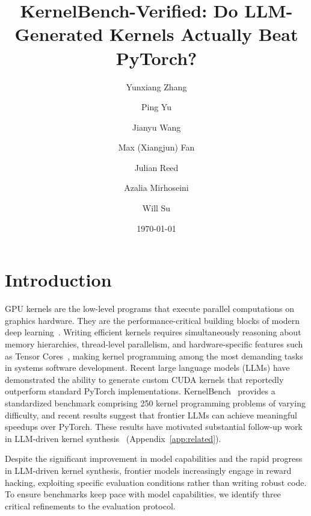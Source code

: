 \documentclass[]{fairmeta}
\title{KernelBench-Verified: Do LLM-Generated Kernels Actually Beat PyTorch?}
\author[1]{Yunxiang Zhang}
\author[2]{Ping Yu}
\author[1]{Jianyu Wang}
\author[1]{Max (Xiangjun) Fan}
\author[3]{Julian Reed}
\author[3]{Azalia Mirhoseini}
\author[1]{Will Su}
\affiliation[1]{Meta}
\affiliation[2]{FAIR at Meta SuperIntelligence Lab}
\affiliation[3]{Stanford University}
\date{\today}
\begin{document}
\maketitle

\section{Introduction}
\label{sec:intro}

GPU kernels are the low-level programs that execute parallel computations on graphics hardware. They are the performance-critical building blocks of modern deep learning~\citep{robustkbench,kernelbench}. Writing efficient kernels requires simultaneously reasoning about memory hierarchies, thread-level parallelism, and hardware-specific features such as Tensor Cores~\citep{nvidia_h200_datasheet,DBLP:journals/corr/abs-2602-24286}, making kernel programming among the most demanding tasks in systems software development. Recent large language models (LLMs) have demonstrated the ability to generate custom CUDA kernels that reportedly outperform standard PyTorch implementations. KernelBench~\citep{kernelbench} provides a standardized benchmark comprising 250 kernel programming problems of varying difficulty, and recent results suggest that frontier LLMs can achieve meaningful speedups over PyTorch. These results have motivated substantial follow-up work in LLM-driven kernel synthesis~\citep{cao2026k,DBLP:journals/corr/abs-2602-24286,du2026kernel,liu2026dr,wiedemann2026kernelfoundry} (Appendix~\ref{app:related}).

Despite the significant improvement in model capabilities and the rapid progress in LLM-driven kernel synthesis, frontier models  increasingly engage in reward hacking, exploiting specific evaluation conditions rather than writing robust code. To ensure benchmarks keep pace with model capabilities, we identify three critical refinements to the evaluation protocol.
\end{document}
